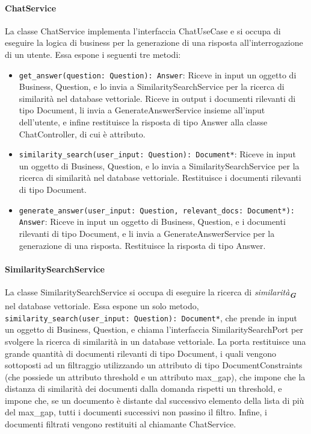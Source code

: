\paragraph{ChatService}
\label{sec:chat_service}
La classe ChatService implementa l'interfaccia ChatUseCase e si occupa di eseguire la logica di business per la generazione di una risposta all'interrogazione di un utente.
Essa espone i seguenti tre metodi:
\begin{itemize}
    \item \texttt{get\_answer(question: Question): Answer}: Riceve in input un oggetto di Business, Question, e lo invia a SimilaritySearchService per la ricerca di similarità nel database vettoriale. Riceve in output i documenti rilevanti di tipo Document, li invia a GenerateAnswerService insieme all'input dell'utente, e infine restituisce la risposta di tipo Answer alla classe ChatController, di cui è attributo.
    \item \texttt{similarity\_search(user\_input: Question): Document*}: Riceve in input un oggetto di Business, Question, e lo invia a SimilaritySearchService per la ricerca di similarità nel database vettoriale. Restituisce i documenti rilevanti di tipo Document.
    \item \texttt{generate\_answer(user\_input: Question, relevant\_docs: Document*): Answer}: Riceve in input un oggetto di Business, Question, e i documenti rilevanti di tipo Document, e li invia a GenerateAnswerService per la generazione di una risposta. Restituisce la risposta di tipo Answer.
\end{itemize}

\paragraph{SimilaritySearchService}
\label{sec:similarity_search_service}
La classe SimilaritySearchService si occupa di eseguire la ricerca di \emph{similarità}\textsubscript{\textbf{\textit{G}}} nel database vettoriale. Essa espone un solo metodo, \texttt{similarity\_search(user\_input: Question): Document*}, che prende in input un oggetto di Business, Question, e chiama l'interfaccia SimilaritySearchPort per svolgere la ricerca di similarità in un database vettoriale. La porta restituisce una grande quantità di documenti rilevanti di tipo Document, i quali vengono sottoposti ad un filtraggio utilizzando un attributo di tipo DocumentConstraints (che possiede un attributo threshold e un attributo max\_gap), che impone che la distanza di similarità dei documenti dalla domanda rispetti un threshold, e impone che, se un documento è distante dal successivo elemento della lista di più del max\_gap, tutti i documenti successivi non passino il filtro. Infine, i documenti filtrati vengono restituiti al chiamante ChatService.

